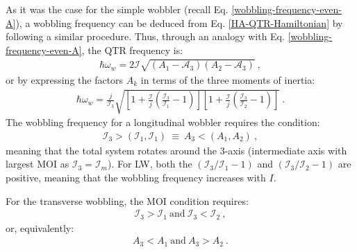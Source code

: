 As it was the case for the simple wobbler (recall Eq. \ref{wobbling-frequency-even-A}), a wobbling frequency can be deduced from Eq. \ref{HA-QTR-Hamiltonian} by following a similar procedure. Thus, through an analogy with Eq. \ref{wobbling-frequency-even-A}, the QTR frequency is:
\begin{align}
    \hbar\omega_w=2\mathscr{I}\sqrt{\left(A_1-\mathscr{A}_3\right)\left(A_2-\mathscr{A}_3\right)}\ ,
    \label{wobbling-frequency-odd-A-inertiaParams}
\end{align}
or by expressing the factors $A_k$ in terms of the three moments of inertia:
\begin{align}
    \hbar\omega_w=\frac{j}{\mathcal{I}_3}\sqrt{\left[1+\frac{\mathscr{I}}{j}\left(\frac{\mathcal{I}_3}{\mathcal{I}_1}-1\right)\right]\left[1+\frac{\mathscr{I}}{j}\left(\frac{\mathcal{I}_3}{\mathcal{I}_2}-1\right)\right]}\ .
    \label{wobbling-frequency-odd-A-MOI}
\end{align}
The wobbling frequency for a longitudinal wobbler requires the condition:
\begin{align}
    \mathcal{I}_3>(\mathcal{I}_1,\mathcal{I}_1)\ \equiv\ A_3<(A_1,A_2)\ ,
\end{align}
meaning that the total system rotates around the $3$-axis (intermediate axis with largest MOI as $\mathcal{I}_3=\mathcal{I}_m$). For LW, both the $(\mathcal{I}_3/\mathcal{I}_1-1)$ and $(\mathcal{I}_3/\mathcal{I}_2-1)$ are positive, meaning that the wobbling frequency increases with $I$.

For the transverse wobbling, the MOI condition requires:
\begin{align}
    \mathcal{I}_3>\mathcal{I}_1\ \text{and}\ \mathcal{I}_3<\mathcal{I}_2\ ,
\end{align}
or, equivalently:
\begin{align}
    A_3<A_1\ \text{and}\ A_3>A_2\ .
\end{align}

